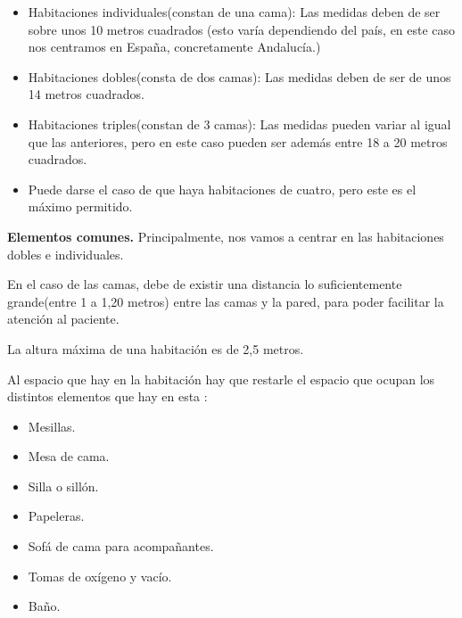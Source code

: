         \begin{itemize}
        	\item Habitaciones individuales(constan de una cama): Las medidas deben de ser sobre unos 10 metros cuadrados (esto varía dependiendo del país, en este caso nos centramos en España, concretamente Andalucía.)\cite{Habitaciones_hospital_medidas}
        	\item Habitaciones dobles(consta de dos camas): Las medidas deben de ser de unos 14 metros cuadrados.\cite{Habitaciones_hospital_medidas}
        	\item Habitaciones triples(constan de 3 camas): Las medidas pueden variar al igual que las anteriores, pero en este caso pueden ser además entre 18 a 20 metros cuadrados.\cite{Habitaciones_hospital_medidas}
        	
         \item Puede darse el caso de que haya habitaciones de cuatro, pero este es el máximo permitido.
         
        \end{itemize} 
        
    \newpage
    \vskip 0.2in
    {\large \textbf{Elementos comunes.}}
    \vskip 0.2in
        Principalmente, nos vamos a centrar en las habitaciones dobles e individuales.
        
        En el caso de las camas, debe de existir una distancia lo suficientemente grande(entre 1 a 1,20 metros) entre las camas y la pared, para poder facilitar la atención al paciente.\cite{Habitaciones_hospital_medidas}
        
        La altura máxima de una habitación es de 2,5 metros.\cite{Habitaciones_hospital_medidas}
        
        Al espacio que hay en la habitación hay que restarle el espacio que ocupan los distintos elementos que hay en esta \cite{Inmobiliario_habitaciones_hospital}:
    
        \begin{itemize}
        	\item Mesillas.\cite{Inmobiliario_habitaciones_hospital_elementos}
        	\item Mesa de cama.\cite{Inmobiliario_habitaciones_hospital_elementos}
        	\item Silla o sillón.\cite{Inmobiliario_habitaciones_hospital_elementos}
        	\item Papeleras.\cite{Inmobiliario_habitaciones_hospital_elementos}
        	\item Sofá de cama para acompañantes.\cite{Inmobiliario_habitaciones_hospital_elementos}
        	\item Tomas de oxígeno y vacío.\cite{Inmobiliario_habitaciones_hospital_elementos}
        	\item Baño.\cite{Inmobiliario_habitaciones_hospital_elementos}
        \end{itemize}

